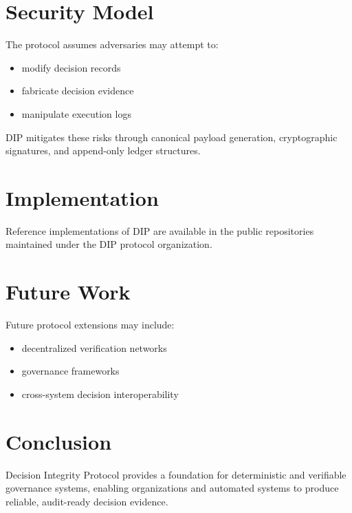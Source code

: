 \documentclass[11pt]{article}
\begin{document}
\section{Security Model}

The protocol assumes adversaries may attempt to:

\begin{itemize}
\item modify decision records
\item fabricate decision evidence
\item manipulate execution logs
\end{itemize}

DIP mitigates these risks through canonical payload generation,
cryptographic signatures, and append-only ledger structures.

\section{Implementation}

Reference implementations of DIP are available in the public
repositories maintained under the DIP protocol organization.

\section{Future Work}

Future protocol extensions may include:

\begin{itemize}
\item decentralized verification networks
\item governance frameworks
\item cross-system decision interoperability
\end{itemize}

\section{Conclusion}

Decision Integrity Protocol provides a foundation for deterministic
and verifiable governance systems, enabling organizations and
automated systems to produce reliable, audit-ready decision evidence.
\end{document}

